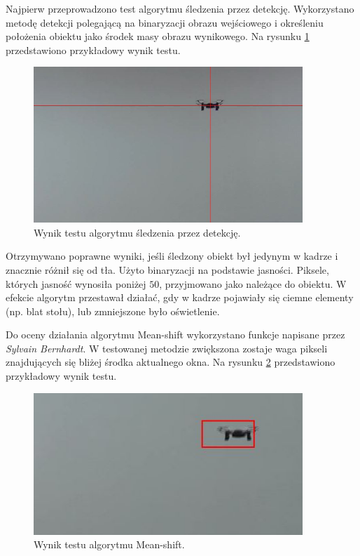 Najpierw przeprowadzono test algorytmu śledzenia przez detekcję. Wykorzystano metodę detekcji polegającą na binaryzacji obrazu wejściowego i określeniu położenia obiektu jako środek masy obrazu wynikowego. Na rysunku \ref{fig:detekcja_test} przedstawiono przykładowy wynik testu.

\begin{figure}[h]
	\centering
	\includegraphics[width=4in]{detekcja_test.jpg}
	\caption{Wynik testu algorytmu śledzenia przez detekcję.}
	\label{fig:detekcja_test}
\end{figure}

Otrzymywano poprawne wyniki, jeśli śledzony obiekt był jedynym w kadrze i znacznie różnił się od tła. Użyto binaryzacji na podstawie jasności. Piksele, których jasność wynosiła poniżej \(50\), przyjmowano jako należące do obiektu. W efekcie algorytm przestawał działać, gdy w kadrze pojawiały się ciemne elementy (np. blat stołu), lub zmniejszone było oświetlenie.

Do oceny działania algorytmu Mean-shift wykorzystano funkcje napisane przez \textit{Sylvain Bernhardt}\cite{Bernhardt}. W testowanej metodzie zwiększona zostaje waga pikseli znajdujących się bliżej środka aktualnego okna. Na rysunku \ref{fig:meanshift_test} przedstawiono przykładowy wynik testu.

\begin{figure}[h]
	\centering
	\includegraphics[width=4in]{meanshift_test.jpg}
	\caption{Wynik testu algorytmu Mean-shift.}
	\label{fig:meanshift_test}
\end{figure}

